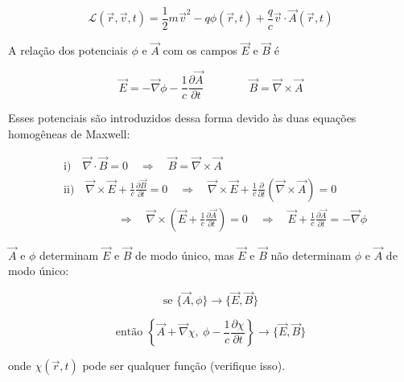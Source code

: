 \begin{equation}
\mathcal{L}(\vec{r}, \vec{v}, t) = \frac{1}{2} m \vec{v}^2 - q\phi(\vec{r}, t) + \frac{q}{c}\vec{v}\cdot\vec{A}(\vec{r}, t)
\label{eq:aula8_lagrangiana_em}
\end{equation}

A relação dos potenciais $\phi$ e $\vec{A}$ com os campos $\vec{E}$ e $\vec{B}$ é

\begin{equation}
\vec{E} = -\vec{\nabla}\phi - \frac{1}{c}\frac{\partial \vec{A}}{\partial t} \qquad\qquad \vec{B} = \vec{\nabla}\times \vec{A}
\label{eq:aula8_campos_potenciais}
\end{equation}

Esses potenciais são introduzidos dessa forma devido às duas equações homogêneas de Maxwell:

\begin{align}
&\text{i)} \quad \vec{\nabla}\cdot\vec{B} = 0 \quad \Longrightarrow \quad \boxed{\vec{B} = \vec{\nabla}\times\vec{A}} \label{eq:aula8_maxwell_homog1}\\[2mm]
&\text{ii)} \quad \vec{\nabla}\times\vec{E} + \frac{1}{c}\frac{\partial \vec{B}}{\partial t} = 0 \quad \Longrightarrow \quad \vec{\nabla}\times\vec{E} + \frac{1}{c}\frac{\partial}{\partial t}(\vec{\nabla}\times\vec{A}) = 0 \nonumber\\
&\hspace{2cm}\Longrightarrow\quad \vec{\nabla}\times\left(\vec{E} + \frac{1}{c}\frac{\partial \vec{A}}{\partial t}\right) = 0 \quad \Longrightarrow \quad \boxed{\vec{E} + \frac{1}{c}\frac{\partial \vec{A}}{\partial t} = -\vec{\nabla}\phi} \label{eq:aula8_maxwell_homog2}
\end{align}

$\vec{A}$ e $\phi$ determinam $\vec{E}$ e $\vec{B}$ de modo único, mas $\vec{E}$ e $\vec{B}$ não determinam $\phi$ e $\vec{A}$ de modo único:

\begin{equation}
\text{se } \{\vec{A}, \phi\} \longrightarrow \{\vec{E}, \vec{B}\}
\label{eq:aula8_gauge_se}
\end{equation}

\begin{equation}
\text{então } \left\{\vec{A} + \vec{\nabla}\chi,\ \phi - \frac{1}{c}\frac{\partial \chi}{\partial t}\right\} \longrightarrow \{\vec{E}, \vec{B}\}
\label{eq:aula8_gauge_entao}
\end{equation}

onde $\chi(\vec{r}, t)$ pode ser qualquer função (verifique isso).


